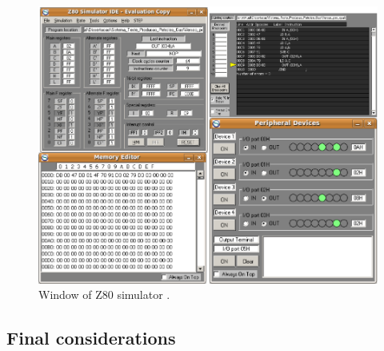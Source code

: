 \documentclass[11pt]{article} %
\begin{document}
\begin{figure}[ht]
\centering
\includegraphics[width=1.0\textwidth]{images/Simulator_Full.png}
\caption{Window of Z80 simulator \cite{Simulator_z80}.}
\label{fig:simulacao}
\end{figure}



\subsection{Final considerations }

\end{document}
